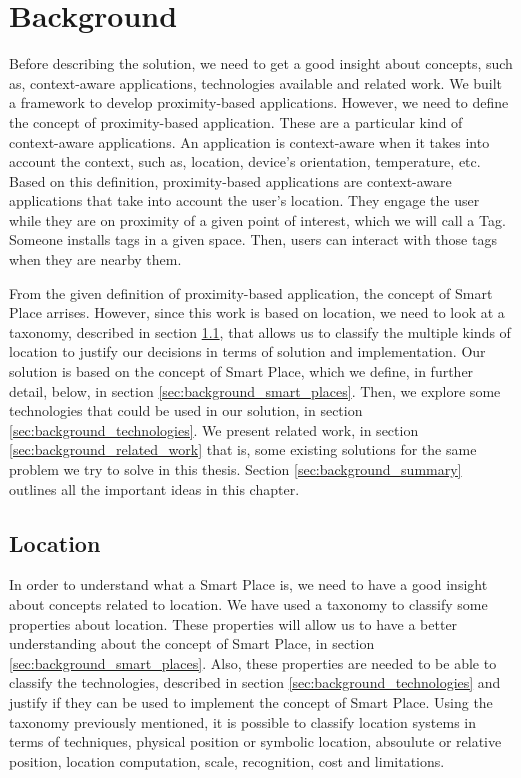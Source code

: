 
\chapter{Background}
\label{chapter:background}
Before describing the solution, we need to get a good insight about concepts, such as, context-aware applications, technologies available and related work.
We built a framework to develop proximity-based applications.
However, we need to define the concept of proximity-based application.
These are a particular kind of context-aware applications.
An application is context-aware when it takes into account the context, such as, location, device's orientation, temperature, etc.
Based on this definition, proximity-based applications are context-aware applications that take into account the user's location.
They engage the user while they are on proximity of a given point of interest, which we will call a Tag.
Someone installs tags in a given space.
Then, users can interact with those tags when they are nearby them.

From the given definition of proximity-based application, the concept of Smart Place arrises.
However, since this work is based on location, we need to look at a taxonomy, described in section \ref{sec:background_location}, that allows us to classify the multiple kinds of location to justify our decisions in terms of solution and implementation.
Our solution is based on the concept of Smart Place, which we define, in further detail, below, in section \ref{sec:background_smart_places}.
Then, we explore some technologies that could be used in our solution, in section \ref{sec:background_technologies}.
We present related work,
in section \ref{sec:background_related_work} that is, some existing solutions for the same problem we try to solve in this thesis.
Section \ref{sec:background_summary} outlines all the important ideas in this chapter.

\section{Location}
\label{sec:background_location}
In order to understand what a Smart Place is, we need to have a good insight about concepts related to location.
We have used a taxonomy\cite{location} to classify some properties about location.
These properties will allow us to have a better understanding about the concept of Smart Place, in section \ref{sec:background_smart_places}.
Also, these properties are needed to be able to classify the technologies, described in section \ref{sec:background_technologies} and justify if they can be used to implement the concept of Smart Place.
Using the taxonomy previously mentioned, it is possible to classify location systems in terms of techniques, physical position or symbolic location, absoulute or relative position, location computation, scale, recognition, cost and limitations.

